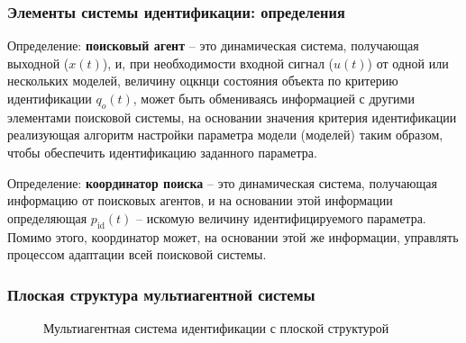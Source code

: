 \documentclass[10pt,utf8]{beamer}
\begin{document}


\begin{frame}
  \frametitle{Элементы системы идентификации: определения}

  Определение: \textbf{поисковый агент} -- это динамическая система, получающая выходной ($x(t)$),
  и, при необходимости входной сигнал ($u(t)$) от одной или нескольких моделей,
  величину оцкнци состояния объекта по критерию идентификации $q_o(t)$,
  может быть обмениваясь информацией с другими элементами поисковой системы,
  на основании значения критерия идентификации
  реализующая алгоритм настройки параметра модели (моделей)
  таким образом, чтобы обеспечить идентификацию заданного параметра.

  Определение: \textbf{координатор поиска} -- это динамическая система, получающая информацию
  от поисковых агентов, и на основании этой информации определяющая
  $p_{\mathrm{id}}(t)$ -- искомую величину идентифицируемого параметра.
  Помимо этого, координатор может, на основании этой же информации,
  управлять процессом адаптации всей поисковой системы.

\end{frame}




\begin{frame}[fragile]
  \frametitle{Плоская структура мультиагентной системы}

  \begin{figure}[ht!]
  \begin{center}
  
  \end{center}
  \caption{Мультиагентная система идентификации с плоской структурой}
  \label{atu:f:agents_flat}
  \end{figure}

\end{frame}



\end{document}
